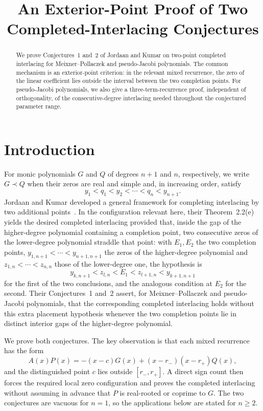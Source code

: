 \documentclass[11pt]{amsart}
\title[Two completed-interlacing conjectures]
{An Exterior-Point Proof of Two Completed-Interlacing Conjectures}
\date{}
\theoremstyle{remark}
\begin{document}
\begin{abstract}
We prove Conjectures~1 and~2 of Jordaan and Kumar on two-point completed
interlacing for Meixner--Pollaczek and pseudo-Jacobi polynomials.  The common
mechanism is an exterior-point criterion: in the relevant mixed recurrence,
the zero of the linear coefficient lies outside the interval between the two
completion points.  For pseudo-Jacobi polynomials, we also give a
three-term-recurrence proof, independent of orthogonality, of the
consecutive-degree interlacing needed throughout the conjectured parameter
range.
\end{abstract}

\maketitle

\section{Introduction}

For monic polynomials $G$ and $Q$ of degrees $n+1$ and $n$, respectively, we
write $G\prec Q$ when their zeros are real and simple and, in increasing order,
satisfy
\[
 y_1<q_1<y_2<\cdots<q_n<y_{n+1}.
\]
Jordaan and Kumar developed a general framework for completing interlacing by
two additional points~\cite{JordaanKumar}.  In the configuration relevant here,
their Theorem~2.2(e) yields the desired completed interlacing provided that,
inside the gap of the higher-degree polynomial containing a completion point,
two consecutive zeros of the lower-degree polynomial straddle that point: with
$E_1,E_2$ the two completion points, $y_{1,n+1}<\cdots<y_{n+1,n+1}$ the zeros of
the higher-degree polynomial and $z_{1,n}<\cdots<z_{n,n}$ those of the
lower-degree one, the hypothesis is
\[
 y_{k,n+1}<z_{l,n}<E_1<z_{l+1,n}<y_{k+1,n+1}
\]
for the first of the two conclusions, and the analogous condition at $E_2$ for
the second.  Their Conjectures~1 and~2 assert, for Meixner--Pollaczek and
pseudo-Jacobi polynomials, that the corresponding completed interlacing holds
without this extra placement hypothesis whenever the two completion points lie
in distinct interior gaps of the higher-degree polynomial.

We prove both conjectures.  The key observation is that each mixed recurrence
has the form
\[
 A(x)P(x)=-(x-c)G(x)+(x-r_-)(x-r_+)Q(x),
\]
and the distinguished point $c$ lies outside $[r_-,r_+]$.  A direct sign count
then forces the required local zero configuration and proves the completed
interlacing without assuming in advance that $P$ is real-rooted or coprime to
$G$.  The two conjectures are vacuous for $n=1$, so the applications below are
stated for $n\ge2$.
\end{document}

